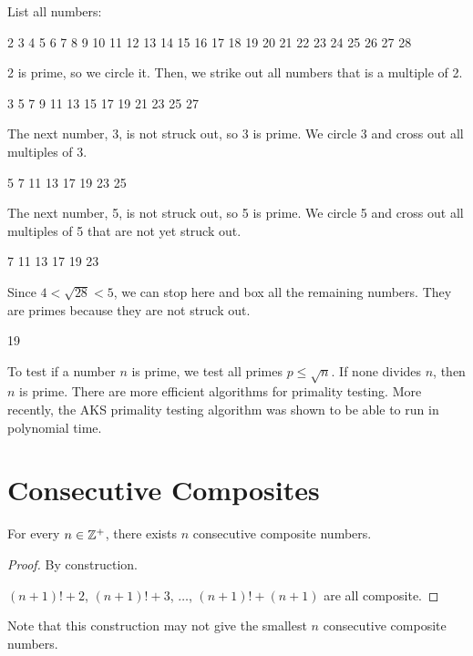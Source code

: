 \begin{example}
    List all numbers:

    2 3 4 5 6 7 8 9 10 11 12 13 14 15 16 17 18 19 20 21 22 23 24 25 26 27 28

    2 is prime, so we circle it. Then, we strike out all numbers that is a multiple of 2.

     3  5  7  9  11  13  15  17  19  21  23  25  27 

    The next number, 3, is not struck out, so 3 is prime. We circle 3 and cross out all multiples of 3.

       5  7    11  13    17  19    23  25   

    The next number, 5, is not struck out, so 5 is prime. We circle 5 and cross out all multiples of 5 that are not yet struck out.

         7    11  13    17  19    23     

    Since $4 < \sqrt{28} < 5$, we can stop here and box all the remaining numbers. They are primes because they are not struck out.

                     19         
\end{example}

To test if a number $n$ is prime, we test all primes $p \leq \sqrt{n}$. If none divides $n$, then $n$ is prime. There are more efficient algorithms for primality testing. More recently, the AKS primality testing algorithm was shown to be able to run in polynomial time.

\section{Consecutive Composites}

\begin{proposition}
    For every $n \in \mathbb{Z}^+$, there exists $n$ consecutive composite numbers.
\end{proposition}

\begin{proof}
    By construction.

    $(n+1)! + 2$, $(n+1)! + 3$, $\ldots$, $(n+1)! + (n+1)$ are all composite.
\end{proof}

Note that this construction may not give the smallest $n$ consecutive composite numbers.

